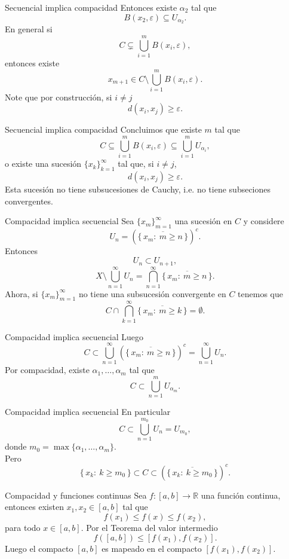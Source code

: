 \documentclass[utf8]{beamer}
\theoremstyle{plain}
\theoremstyle{definition}
\theoremstyle{remark}
\numberwithin{equation}{section}
\newcommand{\al}{\alpha}                %
\newcommand{\eps}{\varepsilon}          %
\newcommand{\bR}{\mathbb{R}}    %
\newcommand{\set}[1]{\{\,#1\,\}}    %
\renewcommand{\geq}{\geqslant}          %
\renewcommand{\leq}{\leqslant}          %
\newcommand{\ov}{\overline}
\begin{document}
\begin{frame}{Secuencial implica compacidad}
Entonces existe  $\al_2$ tal que 
\[ B(x_2,\eps) \subseteq U_{\al_2}. \]
En general si 
$$ C   \subsetneq \bigcup_{i=1}^{m} B(x_i,\eps),$$
entonces existe 
\[ x_{m+1} \in C \setminus   \bigcup_{i=1}^{m} B(x_i,\eps).\]
Note que por construcci\'on, si $ i \not= j$ 
$$ d( x_i, x_j) \geq \eps.$$
 
\end{frame}
\begin{frame}{Secuencial implica compacidad}
Concluimos que existe $m$ tal que 
$$ C   \subseteq \bigcup_{i=1}^{m} B(x_i,\eps) \subseteq \bigcup_{i=1}^{m} U_{\al_i},$$
o existe una sucesi\'on $\{x_k\}_{k=1}^{\infty}$ tal que, si $ i \not= j$, 
$$ d( x_i, x_j) \geq \eps.$$
Esta sucesi\'on no tiene subsucesiones de Cauchy, i.e. no tiene subseciones convergentes. 
 

\end{frame}
\begin{frame}{Compacidad implica secuencial}
Sea  $\{x_m\}_{m=1}^{\infty}$ una sucesi\'on en $C$ y considere 
$$U_n=\left( \ov{\set{x_m:\ m\geq n}} \right)^{c}.$$
Entonces 
$$ U_n \subset U_{n+1},$$
$$ X \setminus \bigcup_{n=1}^{\infty} U_n= \bigcap_{n=1}^{\infty} \ov{\set{x_m:\ m\geq n}}.$$
Ahora, si $\{x_m\}_{m=1}^{\infty}$ no tiene una subsucesi\'on convergente en $C$ tenemos que 
$$C\cap \bigcap_{k=1}^\infty\ov{\set{x_m:\ m\geq k}} = \emptyset.$$  
\end{frame}

\begin{frame}{Compacidad implica secuencial}
Luego 
$$C \subset  \bigcup_{n=1}^\infty \left( \ov{\set{x_m:\ m\geq n}} \right)^{c} =\bigcup_{n=1}^\infty U_n.$$
Por compacidad, existe $\al_1, \ldots, \al_m$ tal que 
$$ C \subset  \bigcup_{n=1}^m U_{\al_m}.$$

\end{frame}

\begin{frame}{Compacidad implica secuencial}
En particular 
$$ C \subset  \bigcup_{n=1}^{m_0} U_{n}=U_{m_0},$$
donde $m_0=\max\{\al_1,\ldots,\al_m\}.$\\
Pero
$$ \set{x_k:\ k\geq m_0} \subset C \subset \left( \ov{\set{x_k:\ k\geq m_0}} \right)^{c}.$$

\end{frame}

\begin{frame}{Compacidad y funciones continuas}
Sea $f:[a,b] \to \bR$ una funci\'on continua, entonces existen $x_1, x_2 \in [a,b]$ tal que 
\[f(x_1) \leq f(x) \leq f(x_2),\]
para todo $ x \in [a,b]$. Por el Teorema del valor intermedio
\[f\left( [a,b]\right) \leq [f(x_1),f(x_2)].\]
Luego el compacto $ [a,b]$ es mapeado en el compacto $ [f(x_1),f(x_2)]$.\\

\end{frame}
\end{document}
